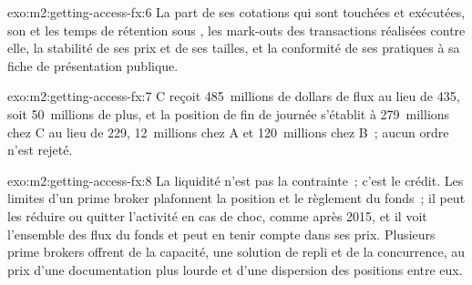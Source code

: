 \begin{solution}{exo:m2:getting-access-fx:6}
La part de ses cotations qui sont touchées et exécutées, son  et les temps de rétention sous
, les mark-outs des transactions réalisées contre elle, la stabilité de ses prix et
de ses tailles, et la conformité de ses pratiques à sa fiche de présentation publique.
\end{solution}

\begin{solution}{exo:m2:getting-access-fx:7}
C reçoit 485~millions de dollars de flux au lieu de 435, soit 50~millions de plus, et la
position de fin de journée s'établit à 279~millions chez C au lieu de 229, 12~millions chez A et 120~millions chez
B~; aucun ordre n'est rejeté.
\end{solution}

\begin{solution}{exo:m2:getting-access-fx:8}
La liquidité n'est pas la contrainte~; c'est le crédit. Les limites d'un prime broker plafonnent la
position et le règlement du fonds~; il peut les réduire ou quitter l'activité en cas de choc, comme après
2015, et il voit l'ensemble des flux du fonds et peut en tenir compte dans ses prix. Plusieurs prime brokers
offrent de la capacité, une solution de repli et de la concurrence, au prix d'une documentation plus lourde
et d'une dispersion des positions entre eux.
\end{solution}

